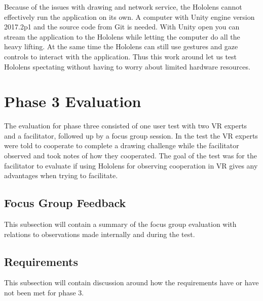         Because of the issues with drawing and network service, the Hololens cannot effectively run the application on its own. A computer with Unity engine version 2017.2p1 and the source code from Git is needed. With Unity open you can stream the application to the Hololens while letting the computer do all the heavy lifting. At the same time the Hololens can still use gestures and gaze controls to interact with the application. Thus this work around let us test Hololens spectating without having to worry about limited hardware resources.
    
    \section{Phase 3 Evaluation} %
    The evaluation for phase three consisted of one user test with two VR experts and a facilitator, followed up by a focus group session. In the test the VR experts were told to cooperate to complete a drawing challenge while the facilitator observed and took notes of how they cooperated. The goal of the test was for the facilitator to evaluate if using Hololens for observing cooperation in VR gives any advantages when trying to facilitate.
        
        \subsection{Focus Group Feedback}
        This subsection will contain a summary of the focus group evaluation with relations to observations made internally and during the test.
        
        \subsection{Requirements}
        This subsection will contain discussion around how the requirements have or have not been met for phase 3.
        
        
        
        
        
        